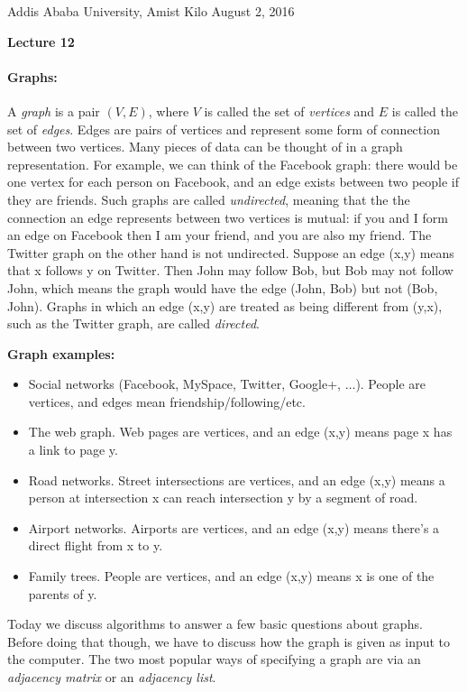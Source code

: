 \documentclass[11pt]{article}
\newlength{\toppush}
\newcommand{\htitle}[2]{\noindent\vspace*{-\toppush}\newline\parbox{6.5in}
 {\large Addis Ababa University, Amist Kilo \hfill #1\newline
\hspace*{\fill}{\bf Algorithms and Programming for High Schoolers} \hspace*{\fill} \newline
\mbox{}\hrulefill\mbox{}}\vspace*{1ex}\mbox{}\newline
\begin{center}{\Large\bf #2}\end{center}}
\begin{document}
\htitle{August 2, 2016}{Lecture 12}

\paragraph{\Large Graphs:}

A {\em graph} is a pair $(V,E)$, where $V$ is called the set of {\em
  vertices} and $E$ is called the set of {\em edges}.  
Edges are pairs of vertices and represent some form of connection
between two vertices.  Many pieces of data can be thought of in a
graph representation.  For example, we can think of the Facebook
graph: there would be one vertex for each person on Facebook, and an
edge exists between two people if they are friends.  Such graphs are
called {\em undirected}, meaning that the the connection an edge
represents between two vertices is mutual: if you and I form an edge
on Facebook then I am your friend, and you are also my friend.  The
Twitter graph on the other hand is not
undirected.  Suppose an edge (x,y) means that x follows y on Twitter.
Then John may follow Bob, but Bob may not follow John, which means the
graph would have the edge (John, Bob) but not (Bob, John).  Graphs in
which an edge (x,y) are treated as being different from (y,x), such as
the Twitter graph, are called {\em directed}.

\medskip
\textbf{Graph examples:}
\begin{itemize}
\item Social networks (Facebook, MySpace, Twitter, Google+,
  $\ldots$). People are vertices, and edges mean
  friendship/following/etc.
\item The web graph. Web pages are vertices, and an edge (x,y) means
  page x has a link to page y.
\item Road networks. Street intersections are vertices, and an edge
  (x,y) means a person at intersection x can reach intersection y by a
  segment of road.
\item Airport networks. Airports are vertices, and an edge (x,y) means
  there's a direct flight from x to y.
\item Family trees. People are vertices, and an edge (x,y) means x
  is one of the parents of y.
\end{itemize}

Today we discuss algorithms to answer a few basic questions about
graphs.  Before doing that though, we have to discuss how the graph is
given as input to the computer. The two most popular ways of
specifying a graph are via an {\em adjacency matrix} or an {\em
  adjacency list}.  
\end{document}
